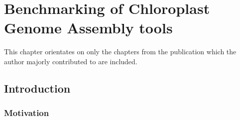 \newcommand{\formatprogramnames}[1]{\texttt{#1}}
\newcommand{\ce}{\formatprogramnames{chloroExtractor}}
\newcommand{\oa}{\formatprogramnames{ORG.Asm}}
\newcommand{\fp}{\formatprogramnames{Fast-Plast}}
\newcommand{\ioga}{\formatprogramnames{IOGA}}
\newcommand{\np}{\formatprogramnames{NOVOPlasty}}
\newcommand{\go}{\formatprogramnames{GetOrganelle}}
\newcommand{\cassp}{\formatprogramnames{Chloroplast assembly protocol}}



\chapter{Benchmarking of Chloroplast Genome Assembly tools } %

\label{Chapter1} %
This chapter orientates on \cite{freudenthal2019landscape} only the chapters from the publication which the author majorly contributed to are included. 


\newcommand{\keyword}[1]{\textbf{#1}}
\newcommand{\tabhead}[1]{\textbf{#1}}
\newcommand{\code}[1]{\texttt{#1}}
\newcommand{\file}[1]{\texttt{\bfseries#1}}
\newcommand{\option}[1]{\texttt{\itshape#1}}


\section{Introduction}
\subsection{Motivation}

